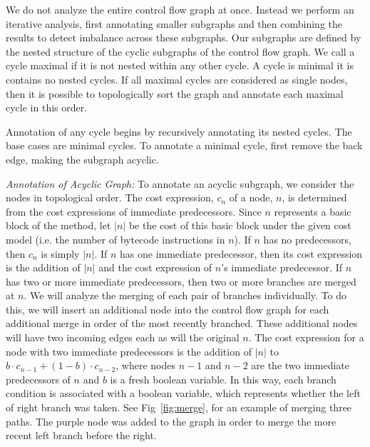 We do not analyze the entire control flow graph at once. Instead we perform an iterative analysis, first annotating smaller subgraphs and then combining the results to detect imbalance across these subgraphs. Our subgraphs are defined by the nested structure of the cyclic subgraphs of the control flow graph. We call a cycle maximal if it is not nested within any other cycle. A cycle is minimal it is contains no nested cycles. If all maximal cycles are considered as single nodes, then it is possible to topologically sort the graph and annotate each maximal cycle in this order. 

Annotation of any cycle begins by recursively annotating its nested cycles. The base cases are minimal cycles. To annotate a minimal cycle, first remove the back edge, making the subgraph acyclic.

\textit{Annotation of Acyclic Graph:} To annotate an acyclic subgraph, we consider the nodes in topological order. The cost expression, $c_n$ of a node, $n$, is determined from the cost expressions of immediate predecessors. Since $n$ represents a basic block of the method, let $|n|$ be the cost of this basic block under the given cost model (i.e. the number of bytecode instructions in $n$).  If $n$ has no predecessors, then $c_n$ is simply $|n|$.  If $n$ has one immediate predecessor, then its cost expression is the addition of $|n|$ and the cost expression of $n$'s immediate predecessor. If $n$ has two or more immediate predecessors, then two or more branches are merged at $n$. We will analyze the merging of each pair of branches individually. To do this, we will insert an additional node into the control flow graph for each additional merge in order of the most recently branched. These additional nodes will have two incoming edges each as will the original $n$. The cost expression for a node with two immediate predecessors is the addition of $|n|$ to $b \cdot c_{n-1} + (1 - b) \cdot c_{n-2}$, where nodes $n-1$ and $n-2$ are the two immediate predecessors of $n$ and $b$ is a fresh boolean variable. In this way, each branch condition is associated with a boolean variable, which represents whether the left of right branch was taken. See Fig~\ref{fig:merge}, for an example of merging three paths. The purple node was added to the graph in order to merge the more recent left branch before the right. 

